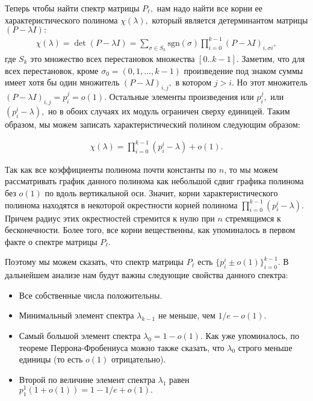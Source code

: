 \documentclass[russian]{article}
\begin{document}
Теперь чтобы найти спектр матрицы $P_\ell,$ нам надо найти все корни ее характеристического полинома $\chi(\lambda),$ который является детерминантом матрицы $(P - \lambda I):$
\begin{align*}
  \chi(\lambda) = \det (P - \lambda I) = \sum\limits_{\sigma \in S_k} \text{sgn}(\sigma) \prod\limits_{i = 0}^{k - 1}(P - \lambda I)_{i, \sigma{i}},
\end{align*}
где $S_k$ это множество всех перестановок множества $[0..k - 1].$ Заметим, что для всех перестановок, кроме $\sigma_0 = (0, 1, \dots, k - 1)$ произведение под знаком суммы имеет хотя бы один множитель $(P - \lambda I)_{i, j},$ в котором $j > i$. Но этот множитель $(P - \lambda I)_{i, j} = p_i^j = o(1)$. Остальные элементы произведения или $p_i^j,$ или $(p_i^i - \lambda),$ но в обоих случаях их модуль ограничен сверху единицей. Таким образом, мы можем записать характеристический полином следующим образом:

\begin{align*}
  \chi(\lambda) = \prod\limits_{i = 0}^{k - 1} (p_i^i - \lambda) + o(1).
\end{align*}

Так как все коэффициенты полинома почти константы по $n$, то мы можем рассматривать график данного полинома как небольшой сдвиг графика полинома без $o(1)$ по вдоль вертикальной оси. Значит, корни характеристического полинома находятся в некоторой окрестности корней полинома $\prod\limits_{i = 0}^{k - 1} (p_i^i - \lambda).$ Причем радиус этих окрестностей стремится к нулю при $n$ стремящимся к бесконечности. Более того, все корни вещественны, как упоминалось в первом факте о спектре матрицы $P_\ell.$

Поэтому мы можем сказать, что спектр матрицы $P_\ell$ есть $\{p_i^i \pm o(1)\}_{i = 0}^{k - 1}.$ В дальнейшем анализе нам будут важны следующие свойства данного спектра:
\begin{itemize}
\item Все собственные числа положительны.
\item Минимальный элемент спектра $\lambda_{k - 1}$ не меньше, чем $1/e - o(1).$
\item Самый большой элемент спектра $\lambda_0 = 1 - o(1).$ Как уже упоминалось, по теореме Перрона-Фробениуса можно также сказать, что $\lambda_0$ строго меньше единицы (то есть $o(1)$ отрицательно).
\item Второй по величине элемент спектра $\lambda_1$ равен $p_1^1 (1 + o(1)) = 1 - 1/e + o(1).$
\end{itemize}
\end{document}
